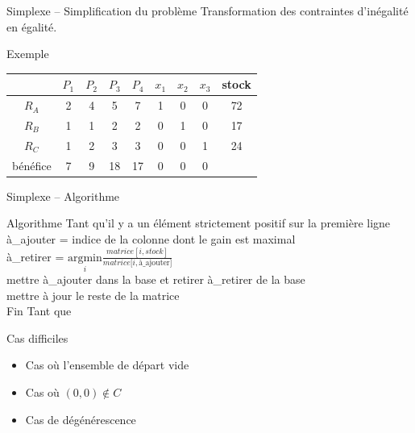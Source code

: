 \documentclass{beamer}
\begin{document}
  \begin{frame}{Simplexe -- Simplification du problème}
    Transformation des contraintes d'inégalité en égalité.

    \begin{exampleblock}{Exemple}
      \begin{center}
        \begin{tabular}{|c|ccccccc|c|}\hline
          & $P_1$ & $P_2$ & $P_3$ & $P_4$ & $x_1$ & $x_2$ & $x_3$ & stock \\ \hline
          $R_A$ & 2 & 4 & 5 & 7 & 1 & 0 & 0 & 72 \\
          $R_B$ & 1 & 1 & 2 & 2 & 0 & 1 & 0 & 17 \\
          $R_C$ & 1 & 2 & 3 & 3 & 0 & 0 & 1 & 24 \\ \hline
          bénéfice & 7 & 9 & 18 & 17 & 0 & 0 & 0 & \\ \hline
        \end{tabular}
      \end{center}
    \end{exampleblock}
  \end{frame}

  \begin{frame}{Simplexe -- Algorithme}
    \begin{block}{Algorithme}
      Tant qu'il y a un élément strictement positif sur la première ligne\\
      \quad à\_ajouter = indice de la colonne dont le gain est maximal \\
      \quad à\_retirer = $\underset{i}{\text{argmin}} \frac{
                      matrice[i, stock]}{matrice[i, \text{à\_ajouter]}}$ \\
      \quad mettre à\_ajouter dans la base et retirer à\_retirer de la base \\
      \quad mettre à jour le reste de la matrice \\
      Fin Tant que
    \end{block}

    \begin{block}{Cas difficiles}
      \begin{itemize}
        \item Cas où l'ensemble de départ vide
        \item Cas où $(0,0) \notin C$
        \item Cas de dégénérescence
      \end{itemize}
    \end{block}
  \end{frame}
\end{document}
